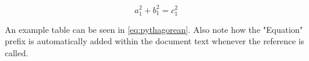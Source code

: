 \begin{equation}
   \label{eq:pythagorean}
   a_1^2 + b_1^2 = c_1^2 
\end{equation}

An example table can be seen in \ref{eq:pythagorean}.
Also note how the "Equation" prefix is automatically added within the document text whenever the reference is called.
